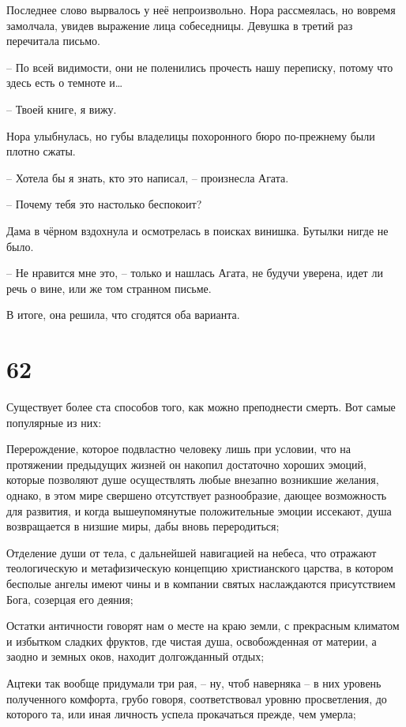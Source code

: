 \documentclass[
  a5paperpaper,
  DIV=11,
  numbers=noendperiod]{scrreprt}
\begin{document}
Последнее слово вырвалось у неё непроизвольно. Нора рассмеялась, но
вовремя замолчала, увидев выражение лица собеседницы. Девушка в третий
раз перечитала письмо.

-- По всей видимости, они не поленились прочесть нашу переписку, потому
что здесь есть о темноте и\ldots{}

-- Твоей книге, я вижу.

Нора улыбнулась, но губы владелицы похоронного бюро по-прежнему были
плотно сжаты.

-- Хотела бы я знать, кто это написал, -- произнесла Агата.

-- Почему тебя это настолько беспокоит?

Дама в чёрном вздохнула и осмотрелась в поисках винишка. Бутылки нигде
не было.

-- Не нравится мне это, -- только и нашлась Агата, не будучи уверена,
идет ли речь о вине, или же том странном письме.

В итоге, она решила, что сгодятся оба варианта.

\section*{62}\label{62}


Существует более ста способов того, как можно преподнести смерть. Вот
самые популярные из них:

Перерождение, которое подвластно человеку лишь при условии, что на
протяжении предыдущих жизней он накопил достаточно хороших эмоций,
которые позволяют душе осуществлять любые внезапно возникшие желания,
однако, в этом мире свершено отсутствует разнообразие, дающее
возможность для развития, и когда вышеупомянутые положительные эмоции
иссекают, душа возвращается в низшие миры, дабы вновь переродиться;

Отделение души от тела, с дальнейшей навигацией на небеса, что отражают
теологическую и метафизическую концепцию христианского царства, в
котором бесполые ангелы имеют чины и в компании святых наслаждаются
присутствием Бога, созерцая его деяния;

Остатки античности говорят нам о месте на краю земли, с прекрасным
климатом и избытком сладких фруктов, где чистая душа, освобожденная от
материи, а заодно и земных оков, находит долгожданный отдых;

Ацтеки так вообще придумали три рая, -- ну, чтоб наверняка -- в них
уровень полученного комфорта, грубо говоря, соответствовал уровню
просветления, до которого та, или иная личность успела прокачаться
прежде, чем умерла;
\end{document}
